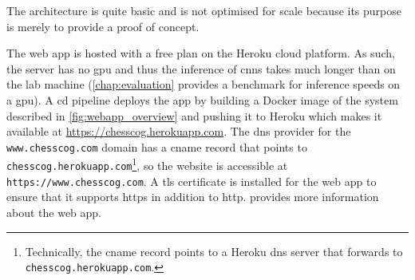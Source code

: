 \documentclass[../report.tex]{subfiles}
\begin{document}
The architecture is quite basic and is not optimised for scale because its purpose is merely to provide a proof of concept.

The web app is hosted with a free plan on the Heroku cloud platform.
As such, the server has no \gls{gpu} and thus the inference of \glspl{cnn} takes much longer than on the lab machine (\cref{chap:evaluation} provides a benchmark for inference speeds on a \gls{gpu}).
A \gls{cd} pipeline deploys the app by building a Docker image of the system described in \cref{fig:webapp_overview} and pushing it to Heroku which makes it available at \url{https://chesscog.herokuapp.com}.
The \gls{dns} provider for the \texttt{www.chesscog.com} domain has a \gls{cname} record that points to \texttt{chesscog.herokuapp.com}\footnote{Technically, the \gls{cname} record points to a Heroku \gls{dns} server that forwards to \texttt{chesscog.herokuapp.com}.}, so the website is accessible at \texttt{https://www.chesscog.com}.
A \gls{tls} certificate is installed for the web app to ensure that it supports \gls{https} in addition to \gls{http}.
 provides more information about the web app.
\end{document}
